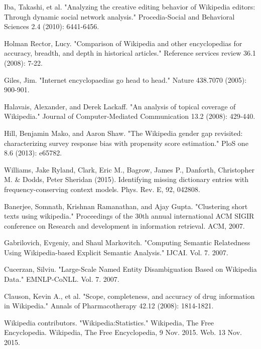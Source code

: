 \documentclass[pre,twocolumn,twoside,superscriptaddress,floatfix, aps, 10pt]{revtex4-1}
\begin{document}
\begin{thebibliography}{1}

       Iba, Takashi, et al. "Analyzing the creative editing behavior of Wikipedia editors: Through dynamic social network analysis." Procedia-Social and Behavioral Sciences 2.4 (2010): 6441-6456.

       Holman Rector, Lucy. "Comparison of Wikipedia and other encyclopedias for accuracy, breadth, and depth in historical articles." Reference services review 36.1 (2008): 7-22.

       Giles, Jim. "Internet encyclopaedias go head to head." Nature 438.7070 (2005): 900-901.

        Halavais, Alexander, and Derek Lackaff. "An analysis of topical coverage of Wikipedia." Journal of Computer‐Mediated Communication 13.2 (2008): 429-440.

         Hill, Benjamin Mako, and Aaron Shaw. "The Wikipedia gender gap revisited: characterizing survey response bias with propensity score estimation." PloS one 8.6 (2013): e65782.

       Williams, Jake Ryland, Clark, Eric M., Bagrow, James P., Danforth, Christopher M. \& Dodds, Peter Sheridan (2015). Identifying missing dictionary entries with frequency-conserving context models. Phys. Rev. E, 92, 042808.

       Banerjee, Somnath, Krishnan Ramanathan, and Ajay Gupta. "Clustering short texts using wikipedia." Proceedings of the 30th annual international ACM SIGIR conference on Research and development in information retrieval. ACM, 2007.

       Gabrilovich, Evgeniy, and Shaul Markovitch. "Computing Semantic Relatedness Using Wikipedia-based Explicit Semantic Analysis." IJCAI. Vol. 7. 2007.

       Cucerzan, Silviu. "Large-Scale Named Entity Disambiguation Based on Wikipedia Data." EMNLP-CoNLL. Vol. 7. 2007.

       Clauson, Kevin A., et al. "Scope, completeness, and accuracy of drug information in Wikipedia." Annals of Pharmacotherapy 42.12 (2008): 1814-1821.

       Wikipedia contributors. "Wikipedia:Statistics." Wikipedia, The Free Encyclopedia. Wikipedia, The Free Encyclopedia, 9 Nov. 2015. Web. 13 Nov. 2015.


\end{thebibliography}
\end{document}
